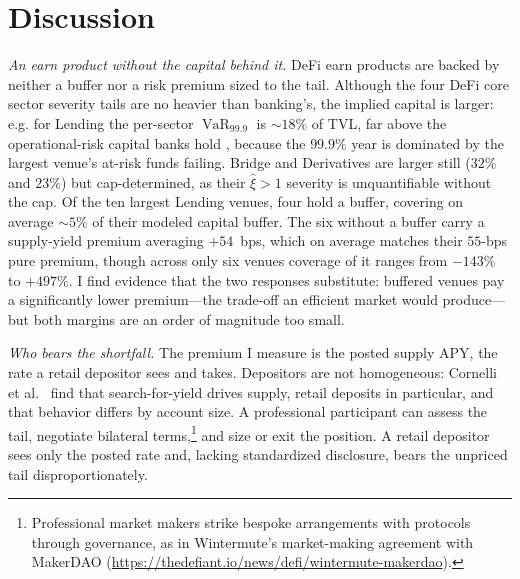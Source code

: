 \documentclass[runningheads]{llncs}
\newcommand{\VaR}{\operatorname{VaR}}
\begin{document}
\section{Discussion}\label{sec:discussion}

\emph{An earn product without the capital behind it.} DeFi earn products
are backed by neither a buffer nor a risk premium sized to the tail.
Although the four DeFi core sector severity tails are no heavier than banking's, the
implied capital is larger: e.g. for Lending the per-sector $\VaR_{99.9}$ is
$\sim 18\%$ of TVL, far above the operational-risk
capital banks hold \citep{Fontnouvelle2006}, because the $99.9\%$ year is dominated by the
largest venue's at-risk funds failing. Bridge and Derivatives are larger
still ($32\%$ and $23\%$) but cap-determined, as their $\hat\xi>1$ severity is
unquantifiable without the cap. Of the ten largest Lending venues, four
hold a buffer, covering on average $\sim 5\%$ of their modeled capital
buffer. The six without a buffer carry a supply-yield premium averaging
$+54$~bps, which on average matches their $55$-bps pure premium, though
across only six venues coverage of it ranges from $-143\%$ to $+497\%$. I find evidence that the two responses substitute: buffered venues pay a significantly lower
premium---the trade-off an efficient market would produce---but both
margins are an order of magnitude too small.

\emph{Who bears the shortfall.} The premium I measure is the posted
supply APY, the rate a retail depositor sees and takes. Depositors are
not homogeneous: Cornelli et al.~\cite{Cornelli2025} find that
search-for-yield drives supply, retail deposits in particular, and that
behavior differs by account size. A professional participant can assess
the tail, negotiate bilateral terms,\footnote{Professional market makers
strike bespoke arrangements with protocols through governance, as in
Wintermute's market-making agreement with MakerDAO
(\url{https://thedefiant.io/news/defi/wintermute-makerdao}).} and size
or exit the position. A retail depositor sees only the posted rate and,
lacking standardized disclosure, bears the unpriced tail
disproportionately.
\end{document}
